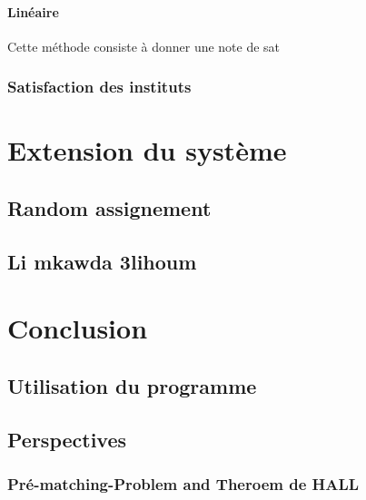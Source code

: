 \documentclass[12pt,titlepage]{article}
\begin{document}
\paragraph{Linéaire}

Cette méthode consiste à donner une note de sat



\subsubsection*{Satisfaction des instituts}


\section{Extension du système}

\subsection{Random assignement}

\subsection{Li mkawda 3lihoum}

\section{Conclusion}

\subsection{Utilisation du programme}


\subsection{Perspectives}

\subsubsection{Pré-matching-Problem and Theroem de HALL}
\end{document}
